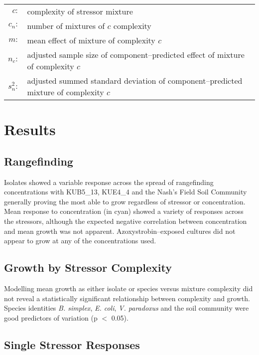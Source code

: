 \documentclass[final,1p,times]{elsarticle}
\begin{document}
\begin{small}
\setlength{\tabcolsep}{1pt}
\begin{tabular}{r p{11cm}}
    $c :$ & complexity of stressor mixture \\
    $c_n :$ & number of mixtures of $c$ complexity \\
    $m :$ & mean effect of mixture of complexity $c$ \\
    $n_c :$ & adjusted sample size of component--predicted effect of mixture of complexity $c$ \\
    $s^2_n :$ & adjusted summed standard deviation of component--predicted mixture of complexity $c$ \\
\end{tabular}
\end{small}

\section{Results}
\label{S:3}

\subsection{Rangefinding}
\label{S:3:1}

Isolates showed a variable response across the spread of rangefinding concentrations with KUB5\_13, KUE4\_4 and the Nash's Field Soil Community generally proving the most able to grow regardless of stressor or concentration. Mean response to concentration (in cyan) showed a variety of responses across the stressors, although the expected negative correlation between concentration and mean growth was not apparent. Azoxystrobin--exposed cultures did not appear to grow at any of the concentrations used.

\subsection{Growth by Stressor Complexity}
\label{S:3:2}

Modelling mean growth as either isolate or species versus mixture complexity did not reveal a statistically significant relationship between complexity and growth. Species identities \textit{B. simplex}, \textit{E. coli}, \textit{V. paradoxus} and the soil community were good predictors of variation (p $<$ 0.05).

\subsection{Single Stressor Responses}
\label{S:3:3}
\end{document}
